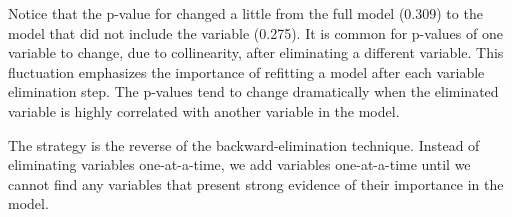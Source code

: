 Notice that the p-value for  changed a little from the full model (0.309) to the model that did not include the  variable (0.275). It is common for p-values of one variable to change, due to collinearity, after eliminating a different variable. This fluctuation emphasizes the importance of refitting a model after each variable elimination step. The p-values tend to change dramatically when the eliminated variable is highly correlated with another variable in the model.

The  strategy is the reverse of the backward-elimination technique. Instead of eliminating variables one-at-a-time, we add variables one-at-a-time until we cannot find any variables that present strong evidence of their importance in the model.

